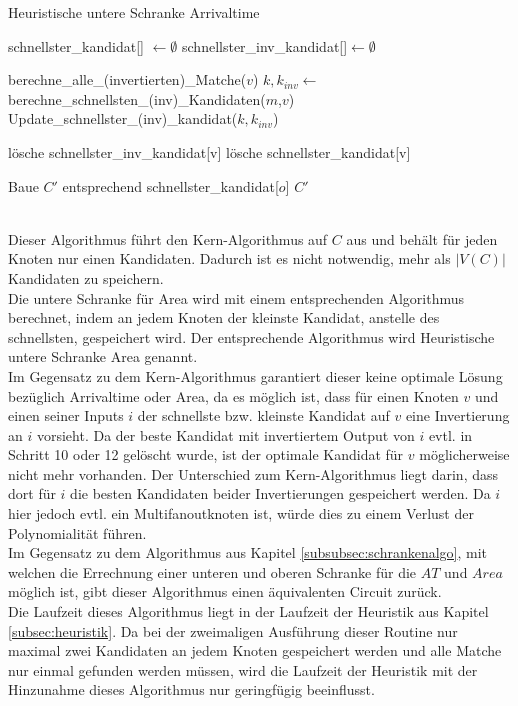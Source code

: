 \documentclass[11pt, a4paper, german]{article}
\begin{document}
\begin{algorithm}[H]
 \LinesNumbered
 \DontPrintSemicolon
 \caption{Heuristische untere Schranke Arrivaltime}

 schnellster\_kandidat[] $\gets \emptyset$\;
 schnellster\_inv\_kandidat[]$ \gets \emptyset$\;
 {
   berechne\_alle\_(invertierten)\_Matche($v$)\;
   {
      $k,k_{inv} \gets $berechne\_schnellsten\_(inv)\_Kandidaten($m$,$v$)\;
      Update\_schnellster\_(inv)\_kandidat($k,k_{inv}$)\;
   }
   {
      
      {
	l\"osche schnellster\_inv\_kandidat[v]\;
      }
      \Else
      {
	l\"osche schnellster\_kandidat[v]\;
      }
   }
 }
 Baue $C'$ entsprechend schnellster\_kandidat[$o$]\;
 \Return $C'$\;
\end{algorithm}\ \\

Dieser Algorithmus führt den Kern-Algorithmus  auf $C$ aus und behält für jeden Knoten nur einen Kandidaten. Dadurch ist es nicht notwendig, mehr als $|V(C)|$ Kandidaten zu speichern. \\
 Die untere Schranke für Area wird mit einem entsprechenden Algorithmus berechnet, indem an jedem Knoten der kleinste Kandidat, anstelle des schnellsten, gespeichert wird. Der entsprechende Algorithmus wird Heuristische untere Schranke Area genannt. \\
Im Gegensatz zu dem Kern-Algorithmus garantiert dieser keine optimale Lösung bezüglich Arrivaltime oder Area, da es möglich ist, dass für einen Knoten $v$ und einen seiner Inputs $i$ der schnellste bzw. kleinste Kandidat auf $v$ eine Invertierung an $i$ vorsieht. Da der beste Kandidat mit invertiertem Output von $i$ evtl. in Schritt 10  oder 12 gelöscht wurde, ist der optimale Kandidat für $v$ möglicherweise nicht mehr vorhanden. Der Unterschied zum Kern-Algorithmus liegt darin, dass dort für $i$ die besten Kandidaten beider Invertierungen gespeichert werden. Da $i$ hier jedoch evtl. ein Multifanoutknoten ist, würde dies zu einem Verlust der Polynomialität führen.\\
Im Gegensatz zu dem Algorithmus aus Kapitel \ref{subsubsec:schrankenalgo}, mit welchen die Errechnung einer unteren und oberen Schranke f\"ur die $AT$ und $Area$ m\"oglich ist, gibt dieser Algorithmus einen \"aquivalenten Circuit zur\"uck.\\
Die Laufzeit dieses Algorithmus liegt in der Laufzeit der Heuristik aus Kapitel \ref{subsec:heuristik}. Da bei der zweimaligen Ausf\"uhrung dieser Routine nur maximal zwei Kandidaten an jedem Knoten gespeichert werden und alle Matche nur einmal gefunden werden müssen, wird die Laufzeit der Heuristik mit der Hinzunahme dieses Algorithmus nur geringfügig beeinflusst.\\
\end{document}

